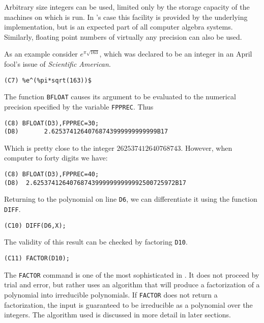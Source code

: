 Arbitrary size integers can be used, limited only by the storage
capacity of the machines on which {\Macsyma} is run.  In {\Macsyma}'s case this
facility is provided by the underlying {\Lisp} implementation, but is an
expected part of all computer algebra systems.  Similarly, floating
point numbers of virtually any precision can also be used.

As an example consider $e^{\pi \sqrt{163}}$, which was declared to be an
integer in an April fool's issue of {\em Scientific
American\/}.

\begin{verbatim}
(C7) %e^(%pi*sqrt(163))$
\end{verbatim}
The {\Macsyma} function {\tt BFLOAT} causes its argument to be evaluated
to the numerical precision specified by the variable {\tt FPPREC}.  Thus
\begin{verbatim}
(C8) BFLOAT(D3),FPPREC=30;
(D8)       2.62537412640768743999999999999B17
\end{verbatim}
Which is pretty close to the integer $262537412640768743$.  However, when
computer to forty digits we have:
\begin{verbatim}
(C8) BFLOAT(D3),FPPREC=40;
(D8)  2.625374126407687439999999999992500725972B17
\end{verbatim}

Returning to the polynomial on line {\tt D6}, we can differentiate it using
the function {\tt DIFF}.
\begin{verbatim}
(C10) DIFF(D6,X);
\end{verbatim}

\noindent
The validity of this result can be checked by factoring {\tt D10}.
\begin{verbatim}
(C11) FACTOR(D10);
\end{verbatim}
The {\tt FACTOR} command is one of the most sophisticated in
{\Macsyma}.  It does not proceed by trial and error, but rather uses an algorithm
that will produce a factorization of a polynomial into irreducible
polynomials.  If {\tt FACTOR} does not return a factorization, the input
is guaranteed to be irreducible as a polynomial over the integers.  The
algorithm used is discussed in more detail in later sections.


